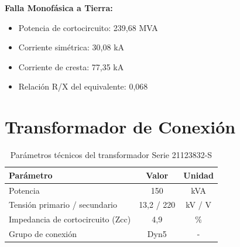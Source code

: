 \textbf{Falla Monofásica a Tierra:}
\begin{itemize}
    \item Potencia de cortocircuito: 239,68 MVA
    \item Corriente simétrica: 30,08 kA
    \item Corriente de cresta: 77,35 kA
    \item Relación R/X del equivalente: 0,068
\end{itemize}

\section{Transformador de Conexión}

\begin{table}[H]
    \centering
    \caption{Parámetros técnicos del transformador Serie 21123832-S}
    \begin{tabular}{lcc}
    \toprule
    \textbf{Parámetro} & \textbf{Valor} & \textbf{Unidad} \\
    \midrule
    Potencia & 150 & kVA \\
    Tensión primario / secundario & 13,2 / 220 & kV / V \\
    Impedancia de cortocircuito (Zcc) & 4,9 & \% \\
    Grupo de conexión & Dyn5 & - \\
    \bottomrule
    \end{tabular}
\end{table}
